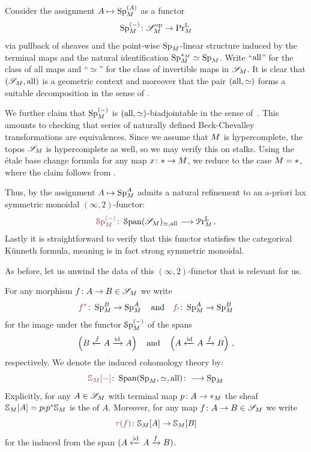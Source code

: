 \begin{cons}\label{cons: anima sixff}
Consider the assignment $ A\mapsto \pSp{\base}[(A)]$ as a functor
\[ \pSp{\base}[(-)]\colon \pSpc{\base}^{\op} \to \pPrl{\base}\] 
via pullback of sheaves and the point-wise
$\pSp{\base}$-linear structure induced by the terminal maps 
and the natural identification $\pSp{\base}[\pt_{\base}]\simeq \pSp{\base}$. Write \enquote{$\mathrm{all}$} for the class of 
all maps and \enquote{$\simeq$} for the class
of invertible maps in $\mathscr{S}_{M}$. It is clear that 
$(\mathscr{S}_{M}, \mathrm{all})$ is a geometric context and moreover that the
pair $(\mathrm{all}, \simeq)$ forms a suitable decomposition in the sense
of \cite{Mann2022}. 

We further claim that $\pSp{\base}[(-)]$ is 
$(\mathrm{all}, \simeq)$-biadjointable in the sense of~\cite[Definition 2.4]{Cnossen_Lenz_Linskens2026}. 
This amounts to checking that series of naturally defined Beck-Chevalley
transformations are equivalences. Since we assume that $M$ is 
hypercomplete, the topos $\mathscr{S}_{M}$ is hypercomplete as well,
so we may verify this on stalks. Using the \'etale base change 
formula  for any map $x\colon \ast \to M$, we reduce
to the case $M = \ast$, where the claim follows from . 

Thus, by \cite[Theorem A]{Cnossen_Lenz_Linskens2026} the assignment
$A\mapsto \pSp{\base}[A]$ admits a natural refinement to an a-priori lax symmetric
monoidal 
$(\infty,2)$-functor:
\[ \mdef{\pSpf{\base}[(-)]}\colon \sSpan{\pSpc{\base}}_{\simeq,\all} \too \pPrlf{\base}\,.\]
Lastly it is straightforward to verify that this functor statisfies the categorical K\"unneth
formula, meaning is in fact strong symmetric monoidal.
\end{cons}

As before, let us unwind the data of this $(\infty,2)$-functor that
is relevant for us.

\begin{notation}
For any morphism $f\colon A\to B \in \mathscr{S}_{M}$ we write 
\[ \mdef{f^*}\colon \pSp{\base}[B]\to \pSp{\base}[A]\quad \text{and}\quad  \mdef{f_!} \colon \pSp{\base}[A]\to \pSp{\base}[B]\]
for the image under the functor $\pSpf{\base}[(-)]$ of the spans 
\[ \left( B \xleftarrow{f} A \xrightarrow{\operatorname{id}}A \right) \quad \text{and} \quad  \left(A \xleftarrow{\operatorname{id}} A \xrightarrow{f} B \right)\,, \]
respectively. We denote the induced cohomology theory by:
\[ \mdef{\SS_{\base}[-]}\colon \Span{\pSp{\base}, \simeq, \all}\colon \too \pSp{\base}\]
Explicitly, for any $A\in \mathscr{S}_{M}$ with terminal map $p\colon A\to \ast_{M}$
the sheaf $\mathbb{S}_{M}[A]=p_!p^*\mathbb{S}_{M}$ is the 
of $A$. Moreover, for any map  $f\colon A\to B\in \mathscr{S}_{M}$ we write 
\[\mdef{\tf{f}}\colon \SS_{\base}[A]\to \SS_{\base}[B]\]
for the  induced from the span $(A \xleftarrow{\operatorname{id}} A \xrightarrow{f} B)$.
\end{notation}


